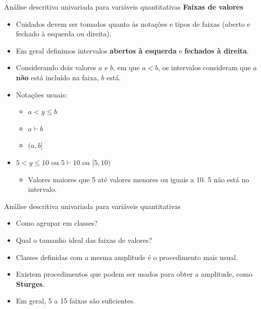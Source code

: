 \documentclass[
  ignorenonframetext,
  serif,
  professionalfont,
  usenames,
  dvipsnames,
  aspectratio = 169]{beamer}
\providecommand{\tightlist}{%
  \setlength{\itemsep}{0pt}\setlength{\parskip}{0pt}}
\renewcommand{\tightlist}{%
  \setlength{\itemsep}{0\baselineskip}
  \setlength{\parskip}{0.25\baselineskip}
}
\def\beginAHalfColumn{\begin{minipage}{0.49\textwidth}}%
\def\endColumns{\end{minipage}}%
\begin{document}
\begin{frame}{Análise descritiva univariada para variáveis
quantitativas}
\protect\hypertarget{anuxe1lise-descritiva-univariada-para-variuxe1veis-quantitativas-3}{}
\textbf{Faixas de valores}

\beginAHalfColumn

\begin{itemize}
\item
  Cuidados devem ser tomados quanto às notações e tipos de faixas
  (aberto e fechado à esquerda ou direita).
\item
  Em geral definimos intervalos \textbf{abertos à esquerda} e
  \textbf{fechados à direita}.
\item
  Considerando dois valores \(a\) e \(b\), em que \(a < b\), os
  intervalos consideram que \(a\) \textbf{não} está incluído na faixa,
  \(b\) está.
\end{itemize}

\endColumns
\beginAHalfColumn

\begin{itemize}
\tightlist
\item
  Notações usuais:

  \begin{itemize}
  \tightlist
  \item
    \(a < y \leq b\)
  \item
    \(a \vdash b\)
  \item
    \((a,b]\)
  \end{itemize}
\item
  \(5 < y \leq 10\) ou \(5 \vdash 10\) ou \([5,10)\)

  \begin{itemize}
  \tightlist
  \item
    Valores maiores que 5 até valores menores ou iguais a 10. 5 não está
    no intervalo.
  \end{itemize}
\end{itemize}

\endColumns
\end{frame}

\begin{frame}{Análise descritiva univariada para variáveis
quantitativas}
\protect\hypertarget{anuxe1lise-descritiva-univariada-para-variuxe1veis-quantitativas-4}{}
\begin{itemize}
\item
  Como agrupar em classes?
\item
  Qual o tamanho ideal das faixas de valores?
\item
  Classes definidas com a mesma amplitude é o procedimento mais usual.
\item
  Existem procedimentos que podem ser usados para obter a amplitude,
  como \textbf{Sturges}.
\item
  Em geral, 5 a 15 faixas são suficientes.
\end{itemize}
\end{frame}
\end{document}
